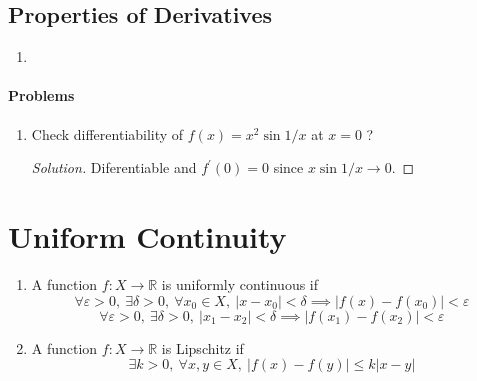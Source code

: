 \subsection{Properties of Derivatives}
\begin{enumerate}
	\item
\end{enumerate}

\paragraph{Problems}
\begin{enumerate}
	\item Check differentiability of $f(x) = x^2 \sin 1/x$ at $x = 0$ ?
	\begin{proof}[Solution]
		Diferentiable and $f^\prime(0) = 0$ since $x\sin 1/x \to 0$.
	\end{proof}
\end{enumerate}

\section{Uniform Continuity}
\begin{enumerate}
	\item A function $f : X \to \mathbb{R}$ is uniformly continuous if 
		$$ \forall \varepsilon > 0,\ \exists \delta > 0,\ \forall x_0 \in X,\ |x-x_0|<\delta \implies |f(x)-f(x_0)| < \varepsilon $$
		$$ \forall \varepsilon > 0,\ \exists \delta > 0,\ |x_1-x_2| < \delta \implies |f(x_1)-f(x_2)| < \varepsilon $$
	\item A function $f : X \to \mathbb{R}$ is Lipschitz if 
		$$ \exists k > 0,\ \forall x,y \in X,\ |f(x)-f(y)| \le k|x-y|$$
\end{enumerate}

